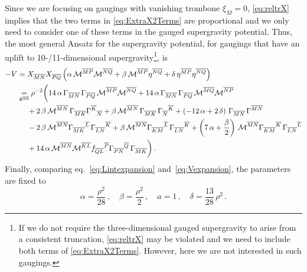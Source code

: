 \documentclass[a4paper, 11pt]{article}
\numberwithin{equation}{section}
\newcommand{\ov}[1]{\overline{#1}}
\newcommand{\+}{\oplus}
\newcommand{\fl}[1]{\ov{#1}}
\newcommand{\M}{\ensuremath{\mathcal{M}}\xspace}
\newcommand{\EM}[1]{\textcolor{red}{#1}}
\newcommand{\CE}[1]{\textcolor{darkorange}{#1}}
\begin{document}
Since we are focusing on gaugings with vanishing trombone $\xi_{\fl{M}} = 0$, \eqref{eq:reltrX} implies that the two terms in \eqref{eq:ExtraX2Terms} are proportional and we only need to consider one of these terms in the gauged supergravity potential. Thus, the most general Ansatz for the supergravity potential, for gaugings that have an uplift to 10-/11-dimensional supergravity\footnote{If we do not require the three-dimensional gauged supergravity to arise from a consistent truncation, \eqref{eq:reltrX} may be violated and we need to include both terms of \eqref{eq:ExtraX2Terms}. However, here we are not interested in such gaugings.}, is
\begin{equation} \label{eq:Vexpansion}
	\begin{aligned}
		-V &= X_{\fl{MN}}X_{\fl{PQ}}\left(\alpha\,\M^{\fl{MP}}\M^{\fl{NQ}}+\beta\,\M^{\fl{MP}}\eta^{\fl{NQ}}+\delta\,\eta^{\fl{MP}}\eta^{\fl{NQ}}
		\right) \\
		&\underset{\rm gSS}{=} \rho^{-2}\bigg(14\,\alpha\,\Gamma_{\fl{MN}}\,\Gamma_{\fl{PQ}}\,\M^{\fl{MP}}\M^{\fl{NQ}}+14\,\alpha\,\Gamma_{\fl{MN}}\,\Gamma_{\fl{PQ}}\,\M^{\fl{MQ}}\M^{\fl{NP}}\\
		&\ \quad +2\,\beta\,\M^{\fl{MN}}\,\Gamma_{\fl{MK}}\Gamma^{\fl{K}}{}_{\fl{N}}+\beta\,\M^{\fl{MN}}\,\Gamma_{\fl{MK}}\,\Gamma_{\fl{N}}{}^{\fl{K}}+\left(-12\,\alpha+2\,\delta
		\right)\,\Gamma_{\fl{MN}}\,\Gamma^{\fl{MN}}\\
		&\ \quad -2\,\beta\,\M^{\fl{MN}}\Gamma_{\fl{MK}}{}^{\fl{L}}\,\Gamma_{\fl{LN}}{}^{\fl{K}}+\beta\,\M^{\fl{MN}}\Gamma_{\fl{KM}}{}^{\fl{L}}\,\Gamma_{\fl{LN}}{}^{\fl{K}}+\left(7\,\alpha+\frac{\beta}{2}\right)\,\M^{\fl{MN}}\Gamma_{\fl{KM}}{}^{\fl{K}}\,\Gamma_{\fl{LN}}{}^{\fl{L}}\\
		&\ \quad +14\,\alpha\,\M^{\fl{MN}}\M^{\fl{KL}}f_{\fl{QL}}{}^{\fl{P}}\Gamma_{\fl{PN}}{}^{\fl{Q}}\,\Gamma_{\fl{MK}}\bigg)\,.
	\end{aligned}
\end{equation}
Finally, comparing eq.~\eqref{eq:Lintexpansion} and~\eqref{eq:Vexpansion}, the parameters are fixed to
\begin{equation}
	\alpha = \frac{\rho^{2}}{28}\,,\quad \beta = \frac{\rho^{2}}{2}\,,\quad a=1\,,\quad \delta=\frac{13}{28}\,\rho^{2}\,. %
\end{equation}
\end{document}
